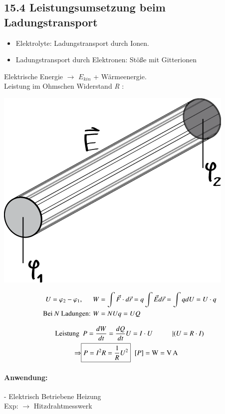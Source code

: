 \documentclass[11pt]{article}
\begin{document}
	\subsection{15.4 Leistungsumsetzung beim Ladungstransport}
	\begin{itemize}
		\item Elektrolyte: Ladungstransport durch Ionen.
		\item Ladungstransport durch Elektronen: Stöße mit Gitterionen
	\end{itemize}
	Elektrische Energie $ \longrightarrow $ $ E_{kin} $ + Wärmeenergie.\\
	Leistung im Ohmschen Widerstand \emph{R} :\\
	\begin{center}
		\includegraphics[width=0.4\linewidth]{skizzen/15/15_4-6/15_4B0}
	\end{center}

	\begin{align*}
	U = \varphi_2-\varphi_1,\hspace{5mm} W&=\int \vec{F} \cdot d\vec{r} = q \int\vec{E}d\vec{r} = \int q dU = U\cdot q  \\
	\text{Bei \emph{N} Ladungen: } W&=NUq=UQ  \\
	\end{align*}
	
	\begin{align*}
	\text{Leistung } &\text{ }P = \frac{dW}{dt} = \frac{dQ}{dt}U = I \cdot U \hspace{1cm} | (U=R\cdot I) \\
	\Rightarrow &\boxed{P = I^2R=\frac{1}{R} U^2 } \hspace{2mm} \text{[$ P $]}=\si{\watt}=\si{\volt\ampere}
	\end{align*}
	\paragraph{Anwendung:}
	- Elektrisch Betriebene Heizung \\
	Exp: $ \longrightarrow $ Hitzdrahtmesswerk 
	
\end{document}
